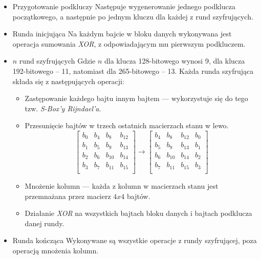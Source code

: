 \documentclass[twoside]{projektInzynierskiMS}
\numberwithin{figure}{section}
\begin{document}
\begin{itemize}
    \item Przygotowanie podkluczy\newline
    Następuje wygenerowanie jednego podklucza początkowego, a następnie po jednym kluczu dla każdej z rund szyfrujących.
    \item Runda inicjująca\newline
    Na każdym bajcie w bloku danych wykonywana jest operacja sumowania \textit{XOR}, z odpowiadającym mu pierwszym podkluczem.
    \item $n$ rund szyfrujących\newline
    Gdzie $n$ dla klucza 128-bitowego wynosi 9, dla klucza 192-bitowego – 11, natomiast dla 265-bitowego – 13.\newline
    Każda runda szyfrująca składa się z następujących operacji:
    \begin{itemize}
        \item Zastępowanie każdego bajtu innym bajtem — wykorzystuje się do tego tzw. \textit{S-Box'y Rijndael'a}.
        \item Przesunięcie bajtów w trzech ostatnich macierzach stanu w lewo.
\[
\begin{bmatrix}
b_{0}&b_{4}&b_{8}&b_{12}\\
b_{1}&b_{5}&b_{9}&b_{13}\\
b_{2}&b_{6}&b_{10}&b_{14}\\
b_{3}&b_{7}&b_{11}&b_{15}\\     
\end{bmatrix}
\to
\begin{bmatrix}
b_{4}&b_{8}&b_{12}&b_{0}\\
b_{5}&b_{9}&b_{13}&b_{1}\\
b_{6}&b_{10}&b_{14}&b_{2}\\
b_{7}&b_{11}&b_{15}&b_{3}\\   
\end{bmatrix} 
\]
        \item Mnożenie kolumn — każda z kolumn w macierzach stanu jest przemnażana przez macierz $4x4$ bajtów.
        \item Działanie \textit{XOR} na wszystkich bajtach bloku danych i bajtach podklucza danej rundy.
    \end{itemize}
    \item Runda kończąca\newline
    Wykonywane są wszystkie operacje z rundy szyfrującej, poza operacją mnożenia kolumn.
\end{itemize}
\end{document}
